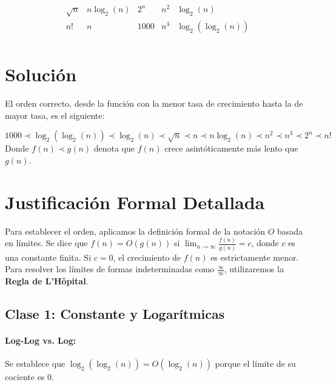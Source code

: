 \documentclass[12pt, a4paper]{article}
\theoremstyle{definition}
\begin{document}
\[
\begin{array}{ccccc}
    \sqrt{n} & n \log_2(n) & 2^n & n^2 & \log_2(n) \\
    n! & n & 1000 & n^3 & \log_2(\log_2(n)) \\
\end{array}
\]








\hrulefill
\section{Solución}

El orden correcto, desde la función con la menor tasa de crecimiento hasta la de mayor tasa, es el siguiente:

\[
1000 \prec \log_2(\log_2(n)) \prec \log_2(n) \prec \sqrt{n} \prec n \prec n \log_2(n) \prec n^2 \prec n^3 \prec 2^n \prec n!
\]
Donde $f(n) \prec g(n)$ denota que $f(n)$ crece asintóticamente más lento que $g(n)$.

\hrulefill
\section{Justificación Formal Detallada}

Para establecer el orden, aplicamos la definición formal de la notación $O$ basada en límites. Se dice que $f(n) = O(g(n))$ si $\lim_{n \to \infty} \frac{f(n)}{g(n)} = c$, donde $c$ es una constante finita. Si $c=0$, el crecimiento de $f(n)$ es estrictamente menor. Para resolver los límites de formas indeterminadas como $\frac{\infty}{\infty}$, utilizaremos la \textbf{Regla de L'Hôpital}.

\subsection{Clase 1: Constante y Logarítmicas}

\paragraph{Log-Log vs. Log:} Se establece que $\log_2(\log_2(n)) = O(\log_2(n))$ porque el límite de su cociente es 0.
\end{document}
